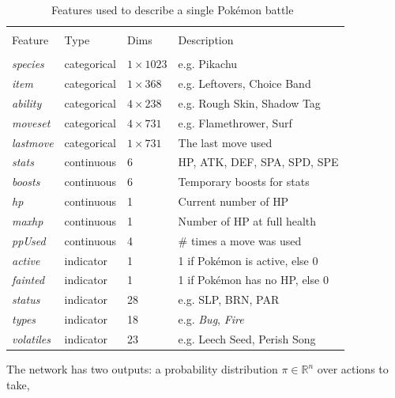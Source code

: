 \begin{table}[h]
\centering
    \begin{tabular}{llll}
    \hline \\
    Feature             & Type        & Dims            & Description                 \\
    \hline \\
    \emph{species}      & categorical & $1 \times 1023$ & e.g. Pikachu                \\
    \emph{item}         & categorical & $1 \times 368$  & e.g. Leftovers, Choice Band  \\
    \emph{ability}      & categorical & $4 \times 238$  & e.g. Rough Skin, Shadow Tag \\
    \emph{moveset}      & categorical & $4 \times 731$  & e.g. Flamethrower, Surf     \\
    \emph{lastmove}     & categorical & $1 \times 731$  & The last move used          \\
    \emph{stats}        & continuous  & 6               & \ac{HP}, \ac{ATK}, \ac{DEF}, \ac{SPA}, \ac{SPD}, \ac{SPE} \\
    \emph{boosts}       & continuous  & 6               & Temporary boosts for stats \\
    \emph{hp}           & continuous  & 1               & Current number of \ac{HP} \\
    \emph{maxhp}        & continuous  & 1               & Number of \ac{HP} at full health \\
    \emph{ppUsed}       & continuous  & 4               & \# times a move was used \\
    \emph{active}       & indicator   & 1               & 1 if Pokémon is active, else 0 \\
    \emph{fainted}      & indicator   & 1               & 1 if Pokémon has no \ac{HP}, else 0 \\
    \emph{status}       & indicator   & 28              & e.g. \ac{SLP}, \ac{BRN}, \ac{PAR} \\
    \emph{types}        & indicator   & 18              & e.g. \textit{Bug}, \textit{Fire} \\
    \emph{volatiles}    & indicator   & 23              & e.g. Leech Seed, Perish Song
    \end{tabular}
    \caption{Features used to describe a single Pokémon battle~\autocite{Huang_Lee_2019}}
    \label{tbl:HuangLee-Pokemon-Table}
\end{table}
The network has two outputs: a probability distribution $\pi \in \mathbb{R}^n$ over actions to take, 
